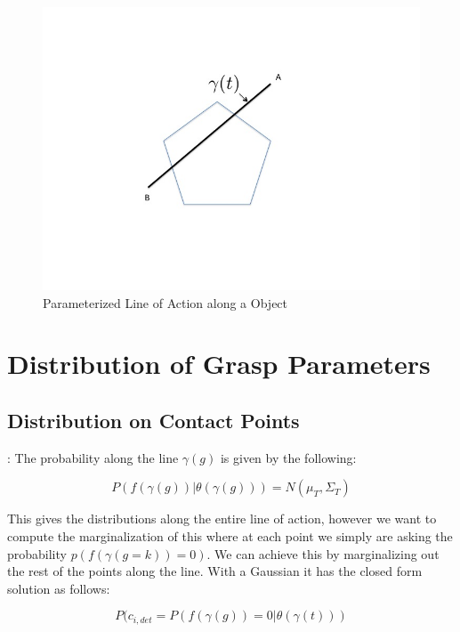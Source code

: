\documentclass[letterpaper, 10 pt, conference]{ieeeconf}  %
\begin{document}
\begin{figure}[ht!]
\centering
\includegraphics[scale = 0.3]{figures/Slide1.jpg}
\caption{Parameterized Line of Action along a Object}
\vspace*{-10pt}
\label{fig:line_of_action}
\end{figure}


\section{Distribution of Grasp Parameters}


\subsection{Distribution on Contact Points}: The probability along the line $\gamma(g)$ is given by the following:

\begin{equation}
P(f(\gamma(g))|\theta(\gamma(g))) = N(\mu_T,\Sigma_T)
\end{equation}

This gives the distributions along the entire line of action, however we want to compute the marginalization of this where at each point we simply are asking the probability $p(f(\gamma(g=k))=0)$. We can achieve this by marginalizing out the rest of the points along the line. With a Gaussian it has the closed form solution as follows: 

\begin{equation}
P(c_{i,det} =  P(f(\gamma(g))=0|\theta(\gamma(t)))
\end{equation}
\end{document}
